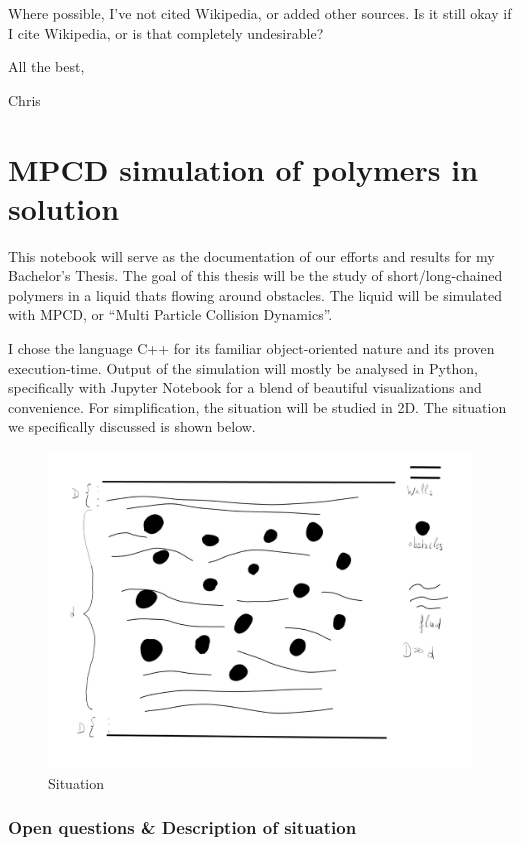\documentclass[
]{article}
\begin{document}
Where possible, I've not cited Wikipedia, or added other sources. Is it
still okay if I cite Wikipedia, or is that completely undesirable?

All the best,

Chris

\hypertarget{mpcd-simulation-of-polymers-in-solution}{%
\section{MPCD simulation of polymers in
solution}\label{mpcd-simulation-of-polymers-in-solution}}

This notebook will serve as the documentation of our efforts and results
for my Bachelor's Thesis. The goal of this thesis will be the study of
short/long-chained polymers in a liquid thats flowing around obstacles.
The liquid will be simulated with MPCD, or ``Multi Particle Collision
Dynamics''.

I chose the language C++ for its familiar object-oriented nature and its
proven execution-time. Output of the simulation will mostly be analysed
in Python, specifically with Jupyter Notebook for a blend of beautiful
visualizations and convenience. For simplification, the situation will
be studied in 2D. The situation we specifically discussed is shown
below.

\begin{figure}
\centering
\includegraphics{Assets/MPCD_Situation.png}
\caption{Situation}
\end{figure}

\hypertarget{open-questions-description-of-situation}{%
\subsubsection{Open questions \& Description of
situation}\label{open-questions-description-of-situation}}
\end{document}
